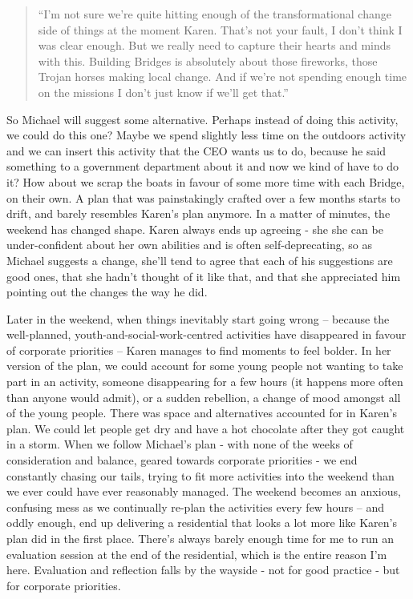 \begin{quote}
“I’m not sure we’re quite hitting enough of the transformational change side of things at the moment Karen. That’s not your fault, I don’t think I was clear enough. But we really need to capture their hearts and minds with this. Building Bridges is absolutely about those fireworks, those Trojan horses making local change. And if we’re not spending enough time on the missions I don’t just know if we’ll get that.”
\end{quote}

So Michael will suggest some alternative. Perhaps instead of doing this activity, we could do this one? Maybe we spend slightly less time on the outdoors activity and we can insert this activity that the CEO wants us to do, because he said something to a government department about it and now we kind of have to do it? How about we scrap the boats in favour of some more time with each Bridge, on their own. A plan that was painstakingly crafted over a few months starts to drift, and barely resembles Karen's plan anymore. In a matter of minutes, the weekend has changed shape. Karen always ends up agreeing - she she can be under-confident about her own abilities and is often self-deprecating, so as Michael suggests a change, she’ll tend to agree that each of his suggestions are good ones, that she hadn’t thought of it like that, and that she appreciated him pointing out the changes the way he did. 

Later in the weekend, when things inevitably start going wrong – because the well-planned, youth-and-social-work-centred activities have disappeared in favour of corporate priorities – Karen manages to find moments to feel bolder. In her version of the plan, we could account for some young people not wanting to take part in an activity, someone disappearing for a few hours (it happens more often than anyone would admit), or a sudden rebellion, a change of mood amongst all of the young people. There was space and alternatives accounted for in Karen's plan. We could let people get dry and have a hot chocolate after they got caught in a storm. When we follow Michael’s plan - with none of the weeks of consideration and balance, geared towards corporate priorities -  we end constantly chasing our tails, trying to fit more activities into the weekend than we ever could have ever reasonably managed. The weekend becomes an anxious, confusing mess as we continually re-plan the activities every few hours – and oddly enough, end up delivering a residential that looks a lot more like Karen’s plan did in the first place. There’s always barely enough time for me to run an evaluation session at the end of the residential, which is the entire reason I’m here. Evaluation and reflection falls by the wayside - not for good practice - but for corporate priorities. 


